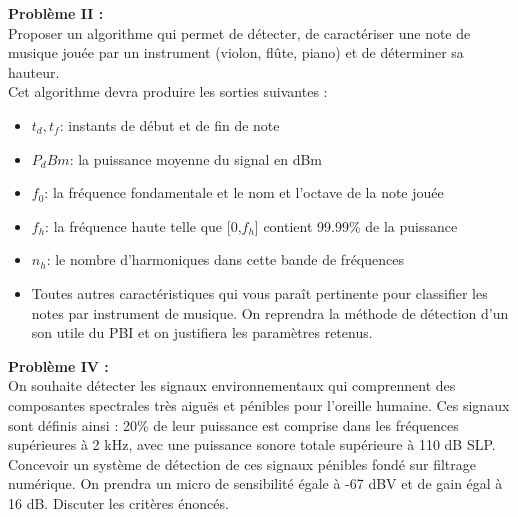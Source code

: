 
\textbf{Problème II :} \  \\
Proposer un algorithme qui permet de détecter, de caractériser une note de musique jouée par un instrument (violon, flûte, piano) et de déterminer sa hauteur. \\
Cet algorithme devra produire les sorties suivantes : \\
\begin{itemize}
    \item $t_d, t_f$: instants de début et de fin de note
    \item $P_dBm$: la puissance moyenne du signal en dBm
    \item $f_0$: la fréquence fondamentale et le nom et l'octave de la note jouée
    \item $f_h$: la fréquence haute telle que [0,$f_h$] contient 99.99\% de la puissance
    \item $n_h$: le nombre d'harmoniques dans cette bande de fréquences
    \item Toutes autres caractéristiques qui vous paraît pertinente pour classifier les notes par instrument de musique.
    On reprendra la méthode de détection d'un son utile du PBI et on justifiera les paramètres retenus.
\end{itemize}

\textbf{Problème IV :} \ \\
On souhaite détecter les signaux environnementaux qui comprennent des composantes spectrales très aiguës et pénibles pour l'oreille humaine. Ces signaux sont définis ainsi : 20\% de leur puissance est comprise dans les fréquences supérieures à 2 kHz, avec une puissance sonore totale supérieure à 110 dB SLP. \\
Concevoir un système de détection de ces signaux pénibles fondé sur filtrage
numérique. On prendra un micro de sensibilité égale à -67 dBV et de gain égal à 16 dB. Discuter les critères énoncés.

  